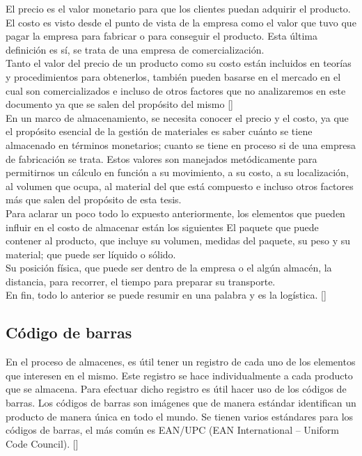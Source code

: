 El precio es el valor monetario para que los clientes puedan adquirir el producto. El costo es visto desde el punto de vista de la empresa como el valor que tuvo que pagar la empresa para fabricar o para conseguir el producto. Esta última definición es sí, se trata de una empresa de comercialización.\\

Tanto el valor del precio de un producto como su costo están incluidos en teorías y procedimientos para obtenerlos, también pueden basarse en el mercado en el cual son comercializados e incluso de otros factores que no analizaremos en este documento ya que se salen del propósito del mismo [\citep{PrinStraMark}]\\

En un marco de almacenamiento, se necesita conocer el precio y el costo, ya que el propósito esencial de la gestión de materiales es saber cuánto se tiene almacenado en términos monetarios; cuanto se tiene en proceso si de una empresa de fabricación se trata. Estos valores son manejados metódicamente para permitirnos un cálculo en función a su movimiento, a su costo, a su localización, al volumen que ocupa, al material del que está compuesto e incluso otros factores más que salen del propósito de esta tesis.\\

Para aclarar un poco todo lo expuesto anteriormente, los elementos que pueden influir en el costo de almacenar están los siguientes
El paquete que puede contener al producto, que incluye su volumen, medidas del paquete, su peso y su material; que puede ser líquido o sólido.\\

Su posición física, que puede ser dentro de la empresa o el algún almacén, la distancia, para recorrer, el tiempo para preparar su transporte.\\

En fin, todo lo anterior se puede resumir en una palabra y es la logística. [\citet{LogAdmiCadSumi}]

\subsection{Código de barras}

En el proceso de almacenes, es útil tener un registro de cada uno de los elementos que interesen en el mismo. Este registro se hace individualmente a cada producto que se almacena. Para efectuar dicho registro es útil hacer uso de los códigos de barras. Los códigos de barras son imágenes que de manera estándar identifican un producto de manera única en todo el mundo.
Se tienen varios estándares para los códigos de barras, el más común es EAN/UPC (EAN International – Uniform Code Council). [\citep{BPS:2019:Online}]\\

